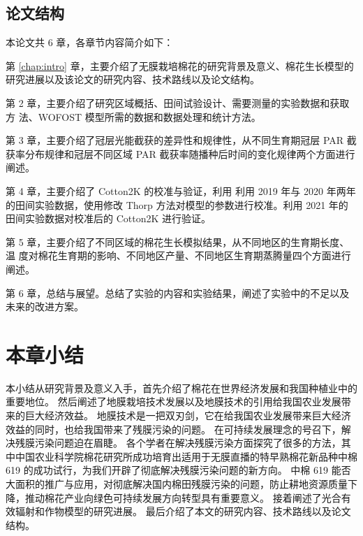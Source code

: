 \subsection{论文结构}
本论文共 6 章，各章节内容简介如下：

第 \ref{chap:intro} 章，主要介绍了无膜栽培棉花的研究背景及意义、棉花生长模型的研究进展以及该论文的研究内容、技术路线以及论文结构。

第 2 章，主要介绍了研究区域概括、田间试验设计、需要测量的实验数据和获取方 法、WOFOST 模型所需的数据和数据处理和统计方法。

第 3 章，主要介绍了冠层光能截获的差异性和规律性，从不同生育期冠层 PAR 截获率分布规律和冠层不同区域 PAR 截获率随播种后时间的变化规律两个方面进行阐述。

第 4 章，主要介绍了 Cotton2K 的校准与验证，利用 利用 2019 年与 2020 年两年的田间实验数据，使用修改 Thorp 方法对模型的参数进行校准。利用 2021 年的田间实验数据对校准后的 Cotton2K 进行验证。

第 5 章，主要介绍了不同区域的棉花生长模拟结果，从不同地区的生育期长度、温 度对棉花生育期的影响、不同地区产量、不同地区生育期蒸腾量四个方面进行阐述。

第 6 章，总结与展望。总结了实验的内容和实验结果，阐述了实验中的不足以及未来的改进方案。

\section{本章小结}
本小结从研究背景及意义入手，首先介绍了棉花在世界经济发展和我国种植业中的重要地位。%
然后阐述了地膜栽培技术发展以及地膜技术的引用给我国农业发展带来的巨大经济效益。%
地膜技术是一把双刃剑，它在给我国农业发展带来巨大经济效益的同时，也给我国带来了残膜污染的问题。%
在可持续发展理念的号召下，解决残膜污染问题迫在眉睫。%
各个学者在解决残膜污染方面探究了很多的方法，其中中国农业科学院棉花研究所成功培育出适用于无膜直播的特早熟棉花新品种中棉 619 的成功试行，为我们开辟了彻底解决残膜污染问题的新方向。%
中棉 619 能否大面积的推广与应用，对彻底解决国内棉田残膜污染的问题，防止耕地资源质量下降，推动棉花产业向绿色可持续发展方向转型具有重要意义。%
接着阐述了光合有效辐射和作物模型的研究进展。%
最后介绍了本文的研究内容、技术路线以及论文结构。
